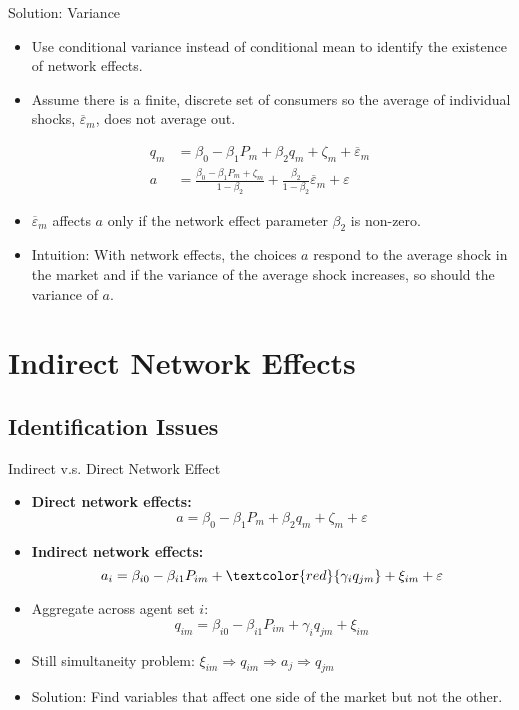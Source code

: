 \documentclass[aspectratio=169]{beamer}  %
\begin{document}
\begin{frame}{Solution: Variance}
    \begin{itemize}
        \item Use conditional variance instead of conditional mean to identify the existence of network effects.
        \item Assume there is a finite, discrete set of consumers so the average of individual shocks, $\overline{\varepsilon}_m$, does not average out.
    \end{itemize}
    \begin{align*}
        q_m &= \beta_0 - \beta_1P_m + \beta_2q_m + \zeta_m + \overline{\varepsilon}_m \\[5pt]
        a &= \frac{\beta_0-\beta_1P_m+\zeta_m}{1-\beta_2} + \frac{\beta_2}{1-\beta_2}\overline{\varepsilon}_m + \varepsilon
    \end{align*}
    \vspace{-0.3cm}
    \begin{itemize}
        \item $\overline{\varepsilon}_m$ affects $a$ only if the network effect parameter $\beta_2$ is non-zero.
        \item Intuition: With network effects, the choices $a$ respond to the average shock in the market and if the variance of the average shock increases, so should the variance of $a$.
    \end{itemize}
    
\end{frame}

\section{Indirect Network Effects}
\subsection{Identification Issues}
\begin{frame}{Indirect v.s. Direct Network Effect}
    \begin{itemize}
        \item \textbf{Direct network effects:} 
        $$ a = \beta_0 - \beta_1P_m + \beta_2q_m + \zeta_m + \varepsilon $$
        \item \textbf{Indirect network effects:}
        $$ a_i = \beta_{i0}-\beta_{i1}P_{im}+\textcolor{red}{\gamma_{i}q_{jm}}+\xi_{im}+\varepsilon$$
        \item Aggregate across agent set $i$:
        $$q_{im} = \beta_{i0} - \beta_{i1}P_{im}+\gamma_{i}q_{jm}+\xi_{im}$$
        \item Still simultaneity problem: $\xi_{im} \Rightarrow q_{im} \Rightarrow a_{j} \Rightarrow q_{jm}$ 
        \item Solution: Find variables that affect one side of the market but not the other.
    \end{itemize}
\end{frame}
\end{document}

